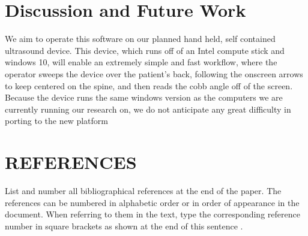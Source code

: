 \documentclass{article}
\begin{document}
\section{Discussion and Future Work}
We aim to operate this software on our planned hand held, self contained ultrasound device. This device, which runs off of an Intel compute stick and windows 10, will enable an extremely simple and fast workflow, where the operator sweeps the device over the patient’s back, following the onscreen arrows to keep centered on the spine, and then reads the cobb angle off of the screen. Because the device runs the same windows version as the computers we are currently running our research on, we do not anticipate any great difficulty in porting to the new platform


\section{REFERENCES}
\label{sec:ref}

List and number all bibliographical references at the end of the paper.  The references can be numbered in alphabetic order or in order of appearance in the document.  When referring to them in the text, type the corresponding reference number in square brackets as shown at the end of this sentence \cite{C2}.



\end{document}
